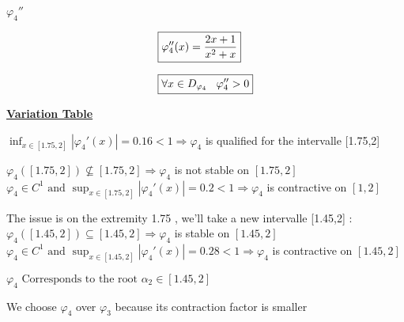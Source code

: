 \vspace{0.5cm}
\textbf{\underline{\(\varphi_4''\)}}
\begin{center}
    \begin{align*}
   &\boxed{\varphi_4''(x) =  \dfrac{2x+1}{x^{2}+x}}\\[0.25cm]
   &\boxed{\forall x \in D_{\varphi_4} \hspace{0.3cm} \varphi_4'' > 0}
    \end{align*}
\end{center}

\newpage
\textbf{\underline{Variation Table}}

\begin{center}
\end{center}
\vspace{0.25cm}

\vspace{0.25cm}

\(\displaystyle\inf_{x \in [1.75,2]} |\varphi_4'(x)| = 0.16 < 1 \Longrightarrow \varphi_4\) is qualified 
for the intervalle [1.75,2]

\vspace{0.5cm}
\(\varphi_4([1.75,2]) \nsubseteq [1.75,2] \Longrightarrow \varphi_4\) is not stable on \([1.75,2]\)\\[0.1cm]
\( \varphi_4 \in C^{1} \text{ and } \displaystyle\sup_{x \in [1.75, 2]} |\varphi_4'(x)| = 0.2 < 1 \Longrightarrow \varphi_4\) is contractive on \([1,2]\)

\vspace{0.5cm}
The issue is on the extremity 1.75 , we'll take a new intervalle [1.45,2] :\\[0.15cm]
\(\varphi_4([1.45,2]) \subseteq [1.45,2] \Longrightarrow \varphi_4\) is stable on \([1.45,2]\)\\[0.1cm]
\( \varphi_4 \in C^{1} \text{ and } \displaystyle\sup_{x \in [1.45, 2]} |\varphi_4'(x)| = 0.28 < 1 \Longrightarrow \varphi_4\) is contractive on \([1.45,2]\)


\begin{center}
    \(\boxed{\varphi_4 \text{ Corresponds to the root } \alpha_2 \in [1.45,2]}\)
\end{center}

We choose \(\varphi_4\) over \(\varphi_3\) because its contraction factor is smaller
